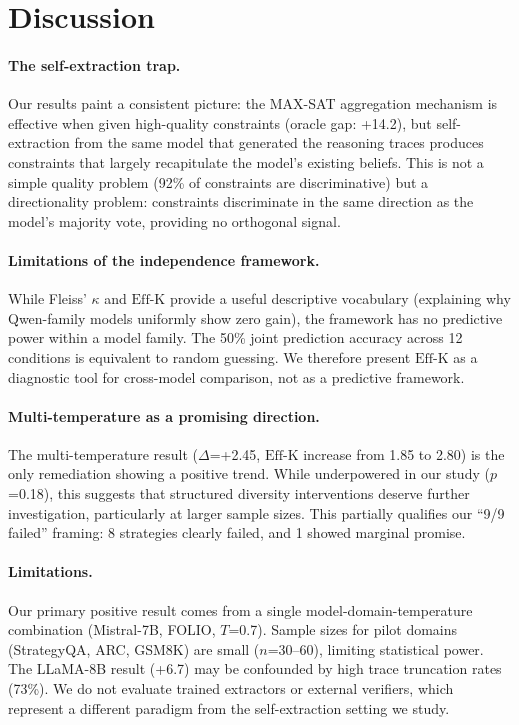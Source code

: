 \documentclass[11pt,a4paper]{article}
\newcommand{\effk}{\text{Eff-K}}
\newcommand{\pp}{\text{pp}}
\begin{document}
\section{Discussion}

\paragraph{The self-extraction trap.}
Our results paint a consistent picture: the MAX-SAT aggregation mechanism is effective when given high-quality constraints (oracle gap: +14.2\pp{}), but self-extraction from the same model that generated the reasoning traces produces constraints that largely recapitulate the model's existing beliefs.
This is not a simple quality problem (92\% of constraints are discriminative) but a directionality problem: constraints discriminate in the same direction as the model's majority vote, providing no orthogonal signal.

\paragraph{Limitations of the independence framework.}
While Fleiss' $\kappa$ and $\effk{}$ provide a useful descriptive vocabulary (explaining why Qwen-family models uniformly show zero gain), the framework has no predictive power within a model family.
The 50\% joint prediction accuracy across 12 conditions is equivalent to random guessing.
We therefore present $\effk{}$ as a diagnostic tool for cross-model comparison, not as a predictive framework.

\paragraph{Multi-temperature as a promising direction.}
The multi-temperature result ($\Delta$=+2.45\pp{}, $\effk{}$ increase from 1.85 to 2.80) is the only remediation showing a positive trend.
While underpowered in our study ($p$=0.18), this suggests that structured diversity interventions deserve further investigation, particularly at larger sample sizes.
This partially qualifies our ``9/9 failed'' framing: 8 strategies clearly failed, and 1 showed marginal promise.

\paragraph{Limitations.}
Our primary positive result comes from a single model-domain-temperature combination (Mistral-7B, FOLIO, $T$=0.7).
Sample sizes for pilot domains (StrategyQA, ARC, GSM8K) are small ($n$=30--60), limiting statistical power.
The LLaMA-8B result (+6.7\pp{}) may be confounded by high trace truncation rates (73\%).
We do not evaluate trained extractors or external verifiers, which represent a different paradigm from the self-extraction setting we study.
\end{document}
